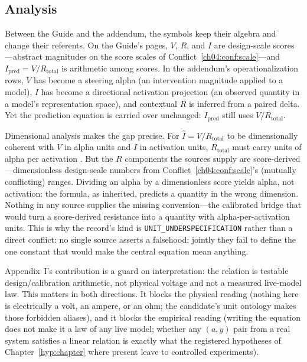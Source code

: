\subsection{Analysis}

Between the Guide and the addendum, the symbols keep their algebra and change
their referents. On the Guide's pages, $V$, $R$, and $I$ are design-scale
scores---abstract magnitudes on the score scales of
Conflict~\ref{ch04:conf:scale}---and $I_{\mathrm{pred}}=V/R_{\mathrm{total}}$
is arithmetic among scores. In the addendum's operationalization rows, $V$
has become a steering alpha (an intervention magnitude applied to a model),
$I$ has become a directional activation projection (an observed quantity in a
model's representation space), and contextual $R$ is inferred from a paired
delta. Yet the prediction equation is carried over unchanged:
$I_{\mathrm{pred}}$ still uses $V/R_{\mathrm{total}}$.

Dimensional analysis makes the gap precise. For
$\hat I = V/R_{\mathrm{total}}$ to be dimensionally coherent with $V$ in
alpha units and $I$ in activation units, $R_{\mathrm{total}}$ must carry
units of alpha per activation \cite{buckingham}. But the $R$ components the
sources supply are score-derived---dimensionless design-scale numbers from
Conflict~\ref{ch04:conf:scale}'s (mutually conflicting) ranges. Dividing an
alpha by a dimensionless score yields alpha, not activation: the formula, as
inherited, predicts a quantity in the wrong dimension. Nothing in any source
supplies the missing conversion---the calibrated bridge that would turn a
score-derived resistance into a quantity with alpha-per-activation units.
This is why the record's kind is \texttt{UNIT\_UNDERSPECIFICATION} rather
than a direct conflict: no single source asserts a falsehood; jointly they
fail to define the one constant that would make the central equation mean
anything.

Appendix~I's contribution is a guard on interpretation: the relation is
testable design/calibration arithmetic, not physical voltage and not a
measured live-model law. This matters in both directions. It blocks the
physical reading (nothing here is electrically a volt, an ampere, or an ohm;
the candidate's unit ontology makes those forbidden aliases), and it blocks
the empirical reading (writing the equation does not make it a law of any
live model; whether any $(a, y)$ pair from a real system satisfies a linear
relation is exactly what the registered hypotheses of
Chapter~\ref{hyp:chapter} where present leave to controlled experiments).

